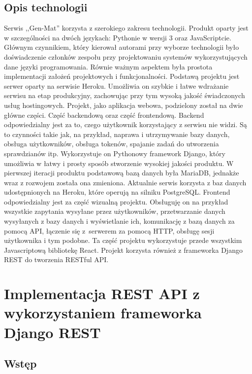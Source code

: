 \documentclass[oneside,polski,logo,indent]{amuthesis}
\begin{document}
\section{Opis technologii}
Serwis ,,Gen-Mat'' korzysta z szerokiego zakresu technologii. Produkt oparty jest w szczególności na dwóch językach: Pythonie w wersji 3 oraz JavaScriptcie. Głównym czynnikiem, który kierował autorami przy wyborze technologii było doświadczenie członków zespołu przy projektowaniu systemów wykorzystujących dane języki programowania. Równie ważnym aspektem była prostota implementacji założeń projektowych i funkcjonalności. Podstawą projektu jest serwer oparty na serwisie Heroku. Umożliwia on szybkie i łatwe wdrażanie serwisu na etap produkcyjny, zachowując przy tym wysoką jakość świadczonych usług hostingowych. Projekt, jako aplikacja webowa, podzielony został na dwie główne części. Część backendową oraz część frontendową.     
Backend odpowiedzialny jest za to, czego użytkownik korzystający z serwisu nie widzi. Są to czynności takie jak, na przykład, naprawa i utrzymywanie bazy danych, obsługa użytkowników, obsługa tokenów, spajanie zadań do utworzenia sprawdzianów itp. Wykorzystuje on Pythonowy framework Django, który umożliwia w łatwy i prosty sposób stworzenie wysokiej jakości produktu. W pierwszej iteracji produktu podstawową bazą danych była MariaDB, jednakże wraz z rozwojem została ona zmieniona. Aktualnie serwis korzysta z baz danych udostępnionych na Heroku, które operują na silniku PostgreSQL.   
Frontend odpowiedzialny jest za część wizualną projektu. Obsługuję on na przykład wszystkie zapytania wysyłane przez użytkowników, przetwarzanie danych wysyłanych z bazy danych i wyświetlanie ich, komunikację z bazą danych za pomocą API, łączenie się z~serwerem za pomocą HTTP, obsługę sesji użytkownika i tym podobne. Ta część projektu wykorzystuje przede wszystkim Javascriptową bibliotekę React. Projekt korzysta również z frameworka Django REST do tworzenia RESTful API.


\chapter{Implementacja REST API z wykorzystaniem frameworka Django REST}

\section{Wstęp}
\end{document}
